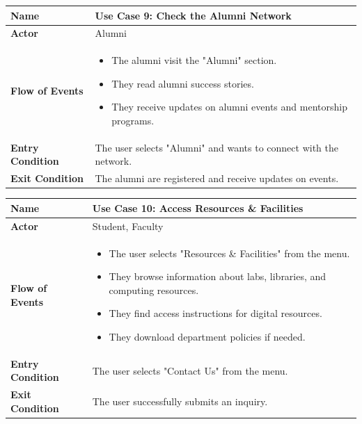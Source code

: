 \documentclass[11pt]{article}
\begin{document}
\begin{center}
\begin{tabular}{ | >{\bfseries}m{6em} | m{10cm} | }
  \hline
  \textbf{Name} & Use Case 9: Check the Alumni Network \\
  \hline
  \textbf{Actor} & Alumni \\
  \hline
  \textbf{Flow of Events} & 
  \begin{itemize}
      \item The alumni visit the "Alumni" section.
      \item They read alumni success stories.
      \item They receive updates on alumni events and mentorship programs.
  \end{itemize} \\
  \hline
  \textbf{Entry Condition} & The user selects "Alumni" and wants to connect with the network. \\
  \hline
  \textbf{Exit Condition} & The alumni are registered and receive updates on events. \\
  \hline
\end{tabular}
\end{center}

\begin{center}
\begin{tabular}{ | >{\bfseries}m{6em} | m{10cm} | }
  \hline
  \textbf{Name} & Use Case 10: Access Resources \& Facilities \\
  \hline
  \textbf{Actor} & Student, Faculty \\
  \hline
  \textbf{Flow of Events} & 
  \begin{itemize}
      \item The user selects "Resources \& Facilities" from the menu.
      \item They browse information about labs, libraries, and computing resources.
      \item They find access instructions for digital resources.
      \item They download department policies if needed.
  \end{itemize} \\
  \hline
  \textbf{Entry Condition} & The user selects "Contact Us" from the menu. \\
  \hline
  \textbf{Exit Condition} & The user successfully submits an inquiry. \\
  \hline
\end{tabular}
\end{center}
\end{document}
